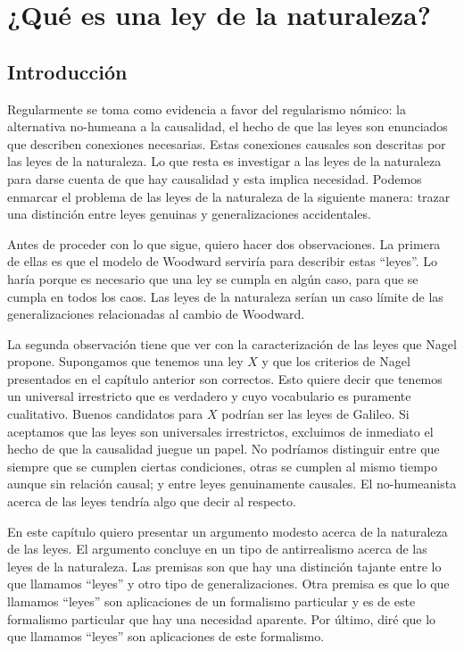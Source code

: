 \chapter{¿Qué es una ley de la naturaleza?}

\section{Introducción}

\noindent Regularmente se toma como evidencia a favor del regularismo nómico: la alternativa no-humeana a la causalidad, el hecho de que las leyes son enunciados que describen conexiones necesarias. Estas conexiones causales son descritas por las leyes de la naturaleza. Lo que resta es investigar a las leyes de la naturaleza para darse cuenta de que hay causalidad y esta implica necesidad. Podemos enmarcar el problema de las leyes de la naturaleza de la siguiente manera: trazar una distinción entre leyes genuinas y generalizaciones accidentales.

Antes de proceder con lo que sigue, quiero hacer dos observaciones. La primera de ellas es que el modelo de Woodward serviría para describir estas ``leyes''. Lo haría porque es necesario que una ley se cumpla en algún caso, para que se cumpla en todos los caos. Las leyes de la naturaleza serían un caso límite de las generalizaciones relacionadas al cambio de Woodward.

La segunda observación tiene que ver con la caracterización de las leyes que Nagel propone. Supongamos que tenemos una ley $X$ y que los criterios de Nagel presentados en el capítulo anterior son correctos. Esto quiere decir que tenemos un universal irrestricto que es verdadero y cuyo vocabulario es puramente cualitativo. Buenos candidatos para $X$ podrían ser las leyes de Galileo. Si aceptamos que las leyes son universales irrestrictos, excluimos de inmediato el hecho de que la causalidad juegue un papel. No podríamos distinguir entre que siempre que se cumplen ciertas condiciones, otras se cumplen al mismo tiempo aunque sin relación causal; y entre leyes genuinamente causales. El no-humeanista acerca de las leyes tendría algo que decir al respecto.

En este capítulo quiero presentar un argumento modesto acerca de la naturaleza de las leyes. El argumento concluye en un tipo de antirrealismo acerca de las leyes de la naturaleza. Las premisas son que hay una distinción tajante entre lo que llamamos ``leyes'' y otro tipo de generalizaciones. Otra premisa es que lo que llamamos ``leyes'' son aplicaciones de un formalismo particular y es de este formalismo particular que hay una necesidad aparente. Por último, diré que lo que llamamos ``leyes'' son aplicaciones de este formalismo.

